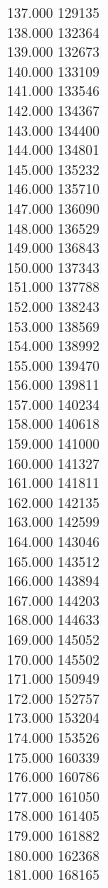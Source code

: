 { 137.000	129135 \\
 138.000	132364 \\
 139.000	132673 \\
 140.000	133109 \\
 141.000	133546 \\
 142.000	134367 \\
 143.000	134400 \\
 144.000	134801 \\
 145.000	135232 \\
 146.000	135710 \\
 147.000	136090 \\
 148.000	136529 \\
 149.000	136843 \\
 150.000	137343 \\
 151.000	137788 \\
 152.000	138243 \\
 153.000	138569 \\
 154.000	138992 \\
 155.000	139470 \\
 156.000	139811 \\
 157.000	140234 \\
 158.000	140618 \\
 159.000	141000 \\
 160.000	141327 \\
 161.000	141811 \\
 162.000	142135 \\
 163.000	142599 \\
 164.000	143046 \\
 165.000	143512 \\
 166.000	143894 \\
 167.000	144203 \\
 168.000	144633 \\
 169.000	145052 \\
 170.000	145502 \\
 171.000	150949 \\
 172.000	152757 \\
 173.000	153204 \\
 174.000	153526 \\
 175.000	160339 \\
 176.000	160786 \\
 177.000	161050 \\
 178.000	161405 \\
 179.000	161882 \\
 180.000	162368 \\
 181.000	168165 \\
}
